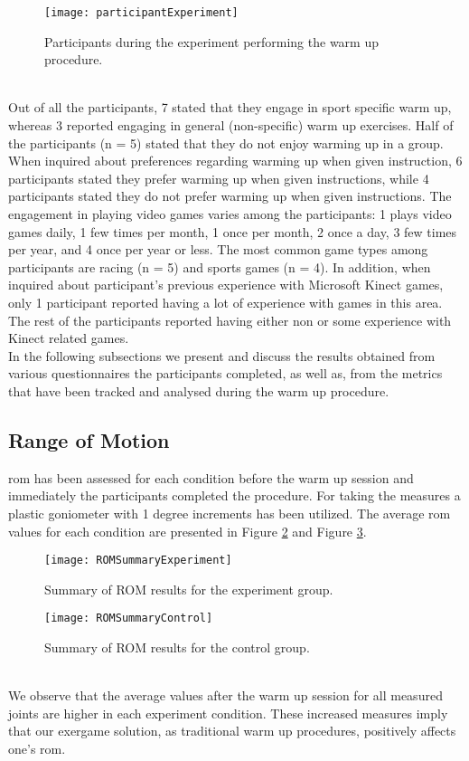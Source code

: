 \begin{figure}[h]
    \centering
    \texttt{[image: participantExperiment]}
    \caption{Participants during the experiment performing the warm up procedure.}
    \label{fig:participants}
\end{figure}\\
Out of all the participants, 7 stated that they engage in sport specific warm up, whereas 3 reported engaging in general  (non-specific) warm up exercises. Half of the participants (n = 5) stated that they do not enjoy warming up in a group. When inquired about preferences regarding warming up when given instruction, 6 participants stated they prefer warming up when given instructions, while 4 participants stated they do not prefer warming up when given instructions. The engagement in playing video games varies among the participants: 1 plays video games daily, 1 few times per month, 1 once per month, 2 once a day, 3 few times per year, and 4 once per year or less. The most common game types among participants are racing (n = 5) and sports games (n = 4). In addition, when inquired about participant's previous experience with Microsoft Kinect games, only 1 participant reported having a lot of experience with games in this area. The rest of the participants reported having either non or some experience with Kinect related games.\\In the following subsections we present and discuss the results obtained from various questionnaires the participants completed, as well as, from the metrics that have been tracked and analysed during the warm up procedure.\pagebreak
\subsection{Range of Motion}
\gls{rom} has been assessed  for each condition before the warm up session and immediately the participants completed the procedure. For taking the measures a plastic goniometer with 1 degree increments has been utilized. The average \acrshort{rom} values for each condition are presented in Figure \ref{fig:romExperiment} and Figure \ref{fig:romControl}.
\begin{figure}[h]
    \centering
    \texttt{[image: ROMSummaryExperiment]}
    \caption{Summary of ROM results for the experiment group.}
    \label{fig:romExperiment}
\end{figure}
\begin{figure}[h]
    \centering
    \texttt{[image: ROMSummaryControl]}
    \caption{Summary of ROM results for the control group.}
    \label{fig:romControl}
\end{figure}\\
We observe that the average values after the warm up session for all measured joints are higher in each experiment condition. These increased measures imply that our exergame solution, as traditional warm up procedures, positively affects one's \acrshort{rom}.
